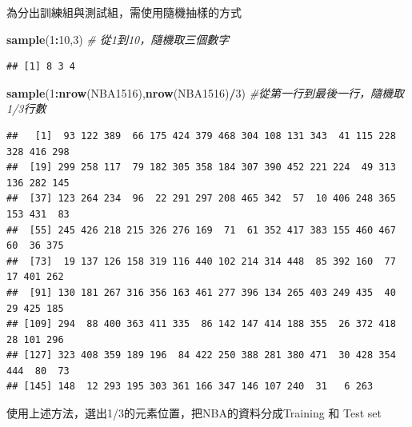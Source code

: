 \documentclass[
]{book}
\newenvironment{Shaded}{\begin{snugshade}}{\end{snugshade}}
\newcommand{\CommentTok}[1]{\textcolor[rgb]{0.56,0.35,0.01}{\textit{#1}}}
\newcommand{\DecValTok}[1]{\textcolor[rgb]{0.00,0.00,0.81}{#1}}
\newcommand{\KeywordTok}[1]{\textcolor[rgb]{0.13,0.29,0.53}{\textbf{#1}}}
\newcommand{\NormalTok}[1]{#1}
\newcommand{\OperatorTok}[1]{\textcolor[rgb]{0.81,0.36,0.00}{\textbf{#1}}}
\newcommand{\StringTok}[1]{\textcolor[rgb]{0.31,0.60,0.02}{#1}}
\begin{document}
為分出訓練組與測試組，需使用隨機抽樣的方式

\begin{Shaded}
\begin{Highlighting}[]
\KeywordTok{sample}\NormalTok{(}\DecValTok{1}\OperatorTok{:}\DecValTok{10}\NormalTok{,}\DecValTok{3}\NormalTok{) }\CommentTok{# 從1到10，隨機取三個數字}
\end{Highlighting}
\end{Shaded}

\begin{verbatim}
## [1] 8 3 4
\end{verbatim}

\begin{Shaded}
\begin{Highlighting}[]
\KeywordTok{sample}\NormalTok{(}\DecValTok{1}\OperatorTok{:}\KeywordTok{nrow}\NormalTok{(NBA1516),}\KeywordTok{nrow}\NormalTok{(NBA1516)}\OperatorTok{/}\DecValTok{3}\NormalTok{) }\CommentTok{#從第一行到最後一行，隨機取1/3行數}
\end{Highlighting}
\end{Shaded}

\begin{verbatim}
##   [1]  93 122 389  66 175 424 379 468 304 108 131 343  41 115 228 328 416 298
##  [19] 299 258 117  79 182 305 358 184 307 390 452 221 224  49 313 136 282 145
##  [37] 123 264 234  96  22 291 297 208 465 342  57  10 406 248 365 153 431  83
##  [55] 245 426 218 215 326 276 169  71  61 352 417 383 155 460 467  60  36 375
##  [73]  19 137 126 158 319 116 440 102 214 314 448  85 392 160  77  17 401 262
##  [91] 130 181 267 316 356 163 461 277 396 134 265 403 249 435  40  29 425 185
## [109] 294  88 400 363 411 335  86 142 147 414 188 355  26 372 418  28 101 296
## [127] 323 408 359 189 196  84 422 250 388 281 380 471  30 428 354 444  80  73
## [145] 148  12 293 195 303 361 166 347 146 107 240  31   6 263
\end{verbatim}

使用上述方法，選出1/3的元素位置，把NBA的資料分成Training 和 Test set

\begin{Shaded}
\end{Shaded}
\end{document}
